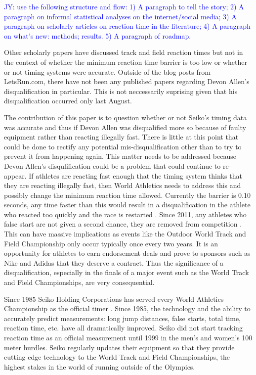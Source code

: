 \documentclass[12pt, letterpaper, titlepage]{article}
\newcommand{\jy}[1]{\textcolor{blue}{JY: #1}}
\begin{document}
\jy{use the following structure and flow:
  1) A paragraph to tell the story;
  2) A paragraph on informal statistical analyses on the internet/social media;
  3) A paragraph on scholarly articles on reaction time in the literature;
  4) A paragraph on what's new: methods; results.
  5) A paragraph of roadmap.}

Other scholarly papers have discussed track and field reaction times but not in the
context of whether the minimum reaction time barrier is too low or whether or not timing
systems were accurate.  Outside of the blog posts from LetsRun.com, there have not been
any published papers regarding Devon Allen's disqualification in particular.  This is not
neccessarily suprising given that his disqualification occurred only last August.

The contribution of this paper is to question whether or not Seiko's timing data
was accurate and thus if Devon Allen was disqualified more so because of faulty
equipment rather than reacting illegally fast.  There is little at this point
that could be done to rectify any potential mis-disqualification other than to try
to prevent it from happening again.  This matter needs to be addressed because Devon Allen's 
disqulification could be a problem that could continue to re-appear.  If athletes
are reacting fast enough that the timing system thinks that they are reacting
illegally fast, then World Athletics needs to address this and possibly change
the minimum reaction time allowed.  Currently the barrier is 0.10 seconds, any time
faster than this would result in a disqualification in the athlete who reacted too
quickly and the race is restarted \citep{Seiko-Timing}.  Since 2011, any athletes who false 
start are not given a second chance, they are removed from competition \citep{False-Start}.  
This can have massive implications as events like the Outdoor World Track and Field Championship 
only occur typically once every two years.  It is an opportunity for athletes to earn endorsement
deals and prove to sponsors such as Nike and Adidas that
they deserve a contract.  Thus the significance of a disqualification, especially in the finals 
of a major event such as the World Track and Field Championships, are very
consequential.  


Since 1985 Seiko Holding Corporations has served every World Athletics Championship
as the official timer \citep{Seiko}.  Since 1985, the technology and the ability
to accurately predict measurements: long jump distances, false starts, total time,
reaction time, etc. have all dramatically improved.  Seiko did not start tracking
reaction time as an official measurement until 1999 in the men's and women's 100 meter
hurdles.  Seiko regularly updates their equipment so that they provide cutting edge
technology to the World Track and Field Championships, the highest stakes in the world
of running outside of the Olympics.
\end{document}
